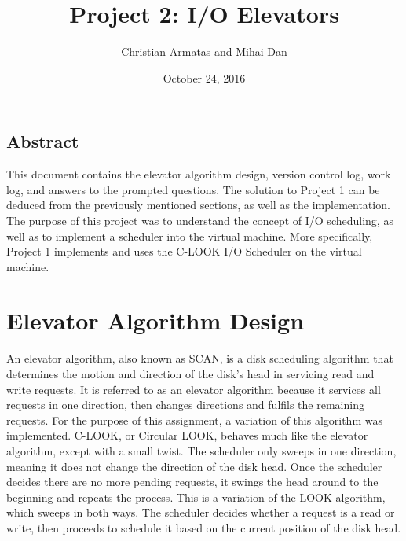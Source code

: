 \documentclass[letterpaper,10pt,onecolumn]{IEEEtran}
\title{Project 2: I/O Elevators}
\author{Christian Armatas and Mihai Dan}
\date{October 24, 2016}
\begin{document}
    \begin{center}
        \begin{minipage}[h]{\textwidth}
            \maketitle
        \end{minipage}
    \end{center}
    
    \vspace{140mm}
    
    \begin{center}
        \section*{Abstract}
        This document contains the elevator algorithm design, version control log, work log, and answers to the prompted questions. The solution to Project 1 can be deduced from the previously mentioned sections, as well as the implementation. The purpose of this project was to understand the concept of I/O scheduling, as well as to implement a scheduler into the virtual machine. More specifically, Project 1 implements and uses the C-LOOK I/O Scheduler on the virtual machine. 
    \end{center}
    
    
    \newpage
    
    
    \section*{Elevator Algorithm Design}
        An elevator algorithm, also known as SCAN, is a disk scheduling algorithm that determines the motion and direction of the disk's head in servicing read and write requests. It is referred to as an elevator algorithm because it services all requests in one direction, then changes directions and fulfils the remaining requests. For the purpose of this assignment, a variation of this algorithm was implemented. C-LOOK, or Circular LOOK, behaves much like the elevator algorithm, except with a small twist. The scheduler only sweeps in one direction, meaning it does not change the direction of the disk head. Once the scheduler decides there are no more pending requests, it swings the head around to the beginning and repeats the process. This is a variation of the LOOK algorithm, which sweeps in both ways. The scheduler decides whether a request is a read or write, then proceeds to schedule it based on the current position of the disk head.
\end{document}

